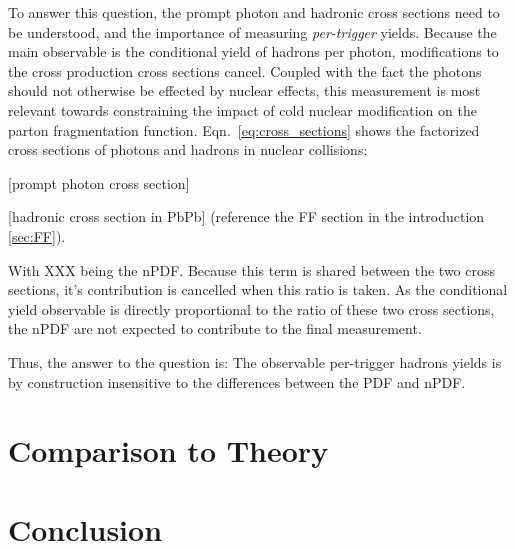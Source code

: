 To answer this question, the prompt photon and hadronic cross sections need to be understood, and the importance of measuring  \textit{per-trigger} yields. Because the main observable is the conditional yield of hadrons per photon, modifications to the cross production cross sections cancel. Coupled with the fact the photons should not otherwise be effected by nuclear effects, this measurement is most relevant towards constraining the impact of cold nuclear modification on the parton fragmentation function. Eqn.~\ref{eq:cross_sections} shows the factorized cross sections of photons and hadrons in nuclear collisions:

[prompt photon cross section]

[hadronic cross section in PbPb] (reference the FF section in the introduction \ref{sec:FF}).

With XXX being the nPDF. Because this term is shared between the two cross sections, it's contribution is cancelled when this ratio is taken. As the conditional yield observable is directly proportional to the ratio of these two cross sections, the nPDF are not expected to contribute to the final measurement.

Thus, the answer to the question is: The observable per-trigger hadrons yields is by construction insensitive to the differences between the PDF and nPDF.
\section{Comparison to Theory}


\section{Conclusion}



